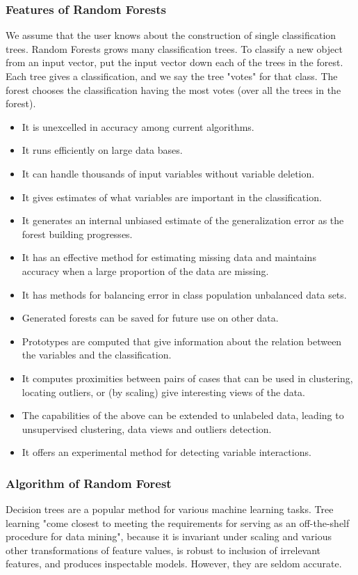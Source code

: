 \documentclass[document.tex]{subfiles}
\begin{document}
\subsubsection{Features of Random Forests}
We assume that the user knows about the construction of single classification trees. Random Forests grows many classification trees. To classify a new object from an input vector, put the input vector down each of the trees in the forest. Each tree gives a classification, and we say the tree "votes" for that class. The forest chooses the classification having the most votes (over all the trees in the forest).
\begin{itemize}
\item It is unexcelled in accuracy among current algorithms.
\item It runs efficiently on large data bases.
\item It can handle thousands of input variables without variable deletion.
\item It gives estimates of what variables are important in the classification.
\item It generates an internal unbiased estimate of the generalization error as the forest building progresses.
\item It has an effective method for estimating missing data and maintains accuracy when a large proportion of the data are missing.
\item It has methods for balancing error in class population unbalanced data sets.
\item Generated forests can be saved for future use on other data.
\item Prototypes are computed that give information about the relation between the variables and the classification.
\item It computes proximities between pairs of cases that can be used in clustering, locating outliers, or (by scaling) give interesting views of the data.
\item The capabilities of the above can be extended to unlabeled data, leading to unsupervised clustering, data views and outliers detection.
\item It offers an experimental method for detecting variable interactions.
\end{itemize}
\subsubsection{Algorithm of Random Forest}
Decision trees are a popular method for various machine learning tasks. Tree learning "come closest to meeting the requirements for serving as an off-the-shelf procedure for data mining", because it is invariant under scaling and various other transformations of feature values, is robust to inclusion of irrelevant features, and produces inspectable models. However, they are seldom accurate.
\end{document}
